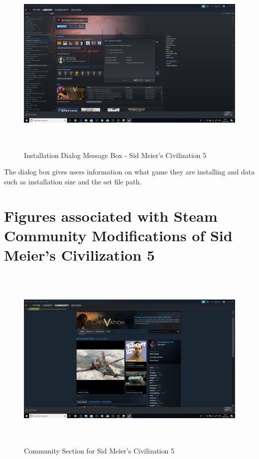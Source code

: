 \begin{figure}[H]
\includegraphics[width=16cm,height=9cm]{Screenshots/SteamScreenShots/InstallDialogForCivilisation5.png}
\caption{Installation Dialog Message Box - Sid Meier's Civilization 5}    
\end{figure}
The dialog box gives users information on what game they are installing and data such as installation size and the set file path. 

\section{Figures associated with Steam Community Modifications of Sid Meier's Civilization 5}

\begin{figure}[H]
\includegraphics[width=16cm,height=9cm]{Screenshots/SteamScreenShots/CommunityForCivilisation5.png}
\caption{Community Section for Sid Meier's Civilization 5}    
\end{figure}

